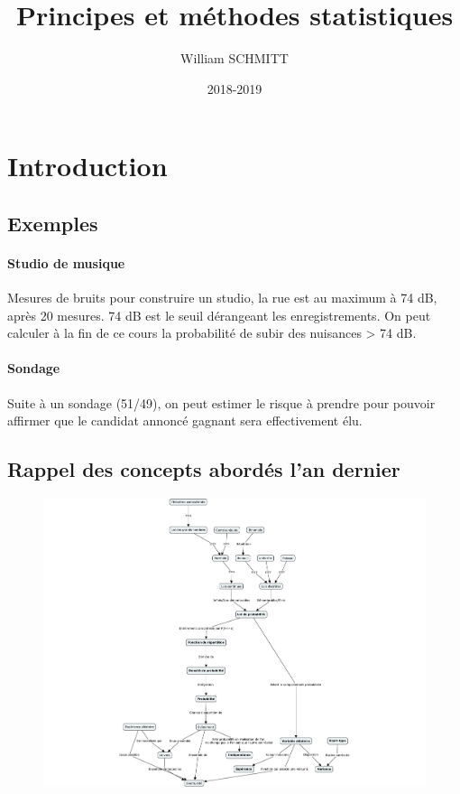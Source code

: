 \documentclass[11pt]{article}
\title{Principes et méthodes statistiques}
\author{William SCHMITT}
\date{2018-2019}
\begin{document}
\maketitle

\tableofcontents

\section{Introduction}

\subsection{Exemples}
\paragraph{Studio de musique} Mesures de bruits pour construire un studio, la
rue est au maximum à 74 dB, après 20 mesures. 74 dB est le seuil dérangeant 
les enregistrements. On peut calculer à la fin de ce cours la probabilité 
de subir des nuisances > 74 dB.

\paragraph{Sondage} Suite à un sondage (51/49), on peut estimer le risque à 
prendre pour pouvoir affirmer que le candidat annoncé gagnant sera effectivement
élu.

\subsection{Rappel des concepts abordés l'an dernier}
\begin{figure}
    \includegraphics[scale=.65]{img/mindmap-1AA-probas.pdf}
\end{figure}
\end{document}
